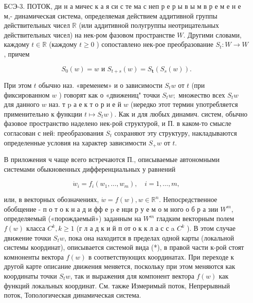 \documentclass[10pt]{article}
\begin{document}
БCЭ-3. ПОТОК, ди н а мичес к а я си с те ма с неп р е р ы в ы м в р е м е н е м,- динамическая система, определяемая действием аддитивной группы действительных чисел $\mathbb{R}$ (или аддитивной полугруппы неотрицательных действительных чисел) на нек-ром фазовом пространстве $W$. Другими словами, каждому $t \in \mathbb{R}$ (каждому $t \geqslant 0$ ) сопоставлено нек-рое преобразование $S_{t}: W \rightarrow W$, причем



\[

S_{0}(w)=w \text { и } S_{t+s}(w)=S_{\boldsymbol{t}}\left(S_{s}(w)\right) .

\]



При этом $t$ обычно наз. «временем» и о зависимости $S_{t} w$ от $t$ (при фиксированном $w$ ) говорят как о «движениц" точки $S_{t} w ;$ множество всех $S_{t} w$ для данного $w$ наз. т $\mathrm{p}$ а е к т о р и е й $w$ (нередко этот термин употребляется применительно к функции $\left.t \longmapsto S_{t} w\right)$. Как и для любых динамич. систем, обычно фазовое пространство наделено нек-рой структурой, и П. в каком-то смысле согласован с ней: преобразования $S_{t}$ сохраняют эту структуру, накладываются определенные условия на характер зависимости $S_{+} w$ от $t$.



В приложения ч чаще всего встречаются П., описываемые автономными системами обыкновенных дифференциальных у равнений



\[

\dot{w}_{i}=f_{i}\left(w_{1}, \ldots, w_{m}\right), \quad i=1, \ldots, m,

\]



или, в векторных обозначениях, $\dot{w}=f(w), w \in \mathbb{R}^{n}$. Непосредственное обобщение - п о т о к н а д и фф е p е нци р у е м о м ного о б р а зии $W^{m}$, определяемый («порождаемый») заданным на $W^{m}$ гладким векторным полем $f(w)$ класса $C^{k}, k \geqslant 1$ (г л а д к и й п от о к к л а с с a $C^{k}$ ). В этом случае движение точки $S_{t} w$, пока она находится в пределах одной карты (локальной системы координат), описывается системой вида (*), в правой части к-рой стоят комноненты вектора $f(w)$ в соответствующих координатах. При переходе к другой карте описание движения меняется, поскольку при этом меняются как координаты точки $S_{t} w$, так и выражения для компонент вектора $f(w)$ как функций локальных координат. См. также Измеримый поток, Непрерывный поток, Топологическая динамическая система.
\end{document}
